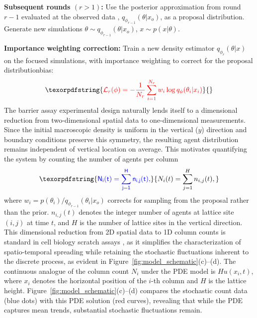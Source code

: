 \documentclass{article}
\providecommand{\DIFaddtex}[1]{{\protect\color{blue} \sf #1}} %
\providecommand{\DIFdeltex}[1]{{\protect\color{red} \scriptsize #1}} %
\providecommand{\DIFaddbegin}{} %
\providecommand{\DIFaddend}{} %
\providecommand{\DIFdelbegin}{} %
\providecommand{\DIFdelend}{} %
\providecommand{\DIFadd}[1]{\texorpdfstring{\DIFaddtex{#1}}{#1}} %
\providecommand{\DIFdel}[1]{\texorpdfstring{\DIFdeltex{#1}}{}} %
\newcommand{\DIFscaledelfig}{0.5}
\newlength{\DIFdelgraphicswidth} %
\newlength{\DIFdelgraphicsheight} %
\newcommand{\DIFaddincludegraphics}[2][]{{\color{blue}\fbox{\DIFOincludegraphics[#1]{#2}}}} %
\newcommand{\DIFdelincludegraphics}[2][]{%
\sbox{\DIFdelgraphicsbox}{\DIFOincludegraphics[#1]{#2}}%
\settoboxwidth{\DIFdelgraphicswidth}{\DIFdelgraphicsbox} %
\settoboxtotalheight{\DIFdelgraphicsheight}{\DIFdelgraphicsbox} %
\scalebox{\DIFscaledelfig}{%
\parbox[b]{\DIFdelgraphicswidth}{\usebox{\DIFdelgraphicsbox}\\[-\baselineskip] \rule{\DIFdelgraphicswidth}{0em}}\llap{\resizebox{\DIFdelgraphicswidth}{\DIFdelgraphicsheight}{%
\setlength{\unitlength}{\DIFdelgraphicswidth}%
\begin{picture}(1,1)%
\thicklines\linethickness{2pt} %
{\color[rgb]{1,0,0}\put(0,0){\framebox(1,1){}}}%
{\color[rgb]{1,0,0}\put(0,0){\line( 1,1){1}}}%
{\color[rgb]{1,0,0}\put(0,1){\line(1,-1){1}}}%
\end{picture}%
}\hspace*{3pt}}} %
} %
\DeclareRobustCommand{\DIFaddbegin}{\DIFOaddbegin \let\includegraphics\DIFaddincludegraphics} %
\DeclareRobustCommand{\DIFaddend}{\DIFOaddend \let\includegraphics\DIFOincludegraphics} %
\DeclareRobustCommand{\DIFdelbegin}{\DIFOdelbegin \let\includegraphics\DIFdelincludegraphics} %
\DeclareRobustCommand{\DIFdelend}{\DIFOaddend \let\includegraphics\DIFOincludegraphics} %
\begin{document}
\DIFdelbegin %
\DIFdel{\textbf{Subsequent rounds $(r > 1)$:} Use the posterior approximation from round $r-1$ evaluated at the observed data , $q_{\phi_{r-1}}(\theta | x_o)$, as a proposal distribution. Generate new simulations $\theta \sim q_{\phi_{r-1}}(\theta | x_o)$, $x \sim p(x|\theta)$. }%

\DIFdel{\textbf{Importance weighting correction:} Train a new density estimator $q_{\phi_r}(\theta | x)$ on the focused simulations, with importance weighting to correct for the proposal distributionbias:
	}\begin{displaymath}
		\DIFdel{\mathcal{L}_r(\phi) = -\frac{1}{N_r} \sum_{i=1}^{N_r} w_i \log q_\phi(\theta_i | x_i)
	}\end{displaymath}%
\DIFdelend \DIFaddbegin \DIFadd{The barrier assay experimental design naturally lends itself to a dimensional reduction from two-dimensional spatial data to one-dimensional measurements. Since the initial macroscopic density is uniform in the vertical ($y$) direction and boundary conditions preserve this symmetry, the resulting agent distribution remains independent of vertical location on average. This motivates quantifying the system by counting the number of agents per column
}\begin{equation}
	\DIFadd{N_i(t) = \sum_{j=1}^{H} n_{i,j}(t),
}\end{equation}\DIFaddend 
where \DIFdelbegin \DIFdel{$w_i = p(\theta_i) / q_{\phi_{r-1}}(\theta_i | x_o)$ corrects for sampling from the proposal rather than the prior.
}%
\DIFdelend \DIFaddbegin \DIFadd{$n_{i,j}(t)$ denotes the integer number of agents at lattice site $(i,j)$ at time $t$, and $H$ is the number of lattice sites in the vertical direction. This dimensional reduction from 2D spatial data to 1D column counts is standard in cell biology scratch assays \citep{Jin2016ScratchRepro}, as it simplifies the characterization of spatio-temporal spreading while retaining the stochastic fluctuations inherent to the discrete process, as evident in Figure~\ref{fig:model_schematic}(c)--(d). The continuous analogue of the column count $N_i$ under the PDE model is $Hu(x_i,t)$, where $x_i$ denotes the horizontal position of the $i$-th column and $H$ is the lattice height. Figure~\ref{fig:model_schematic}(c)--(d) compares the stochastic count data (blue dots) with this PDE solution (red curves), revealing that while the PDE captures mean trends, substantial stochastic fluctuations remain.
}\DIFaddend 
\end{document}
